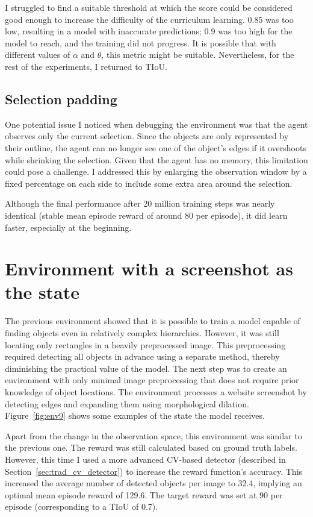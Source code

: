 \documentclass[
  digital,     %
  oneside,     %
  nosansbold,  %
  nocolorbold, %
  lof,         %
  lot,         %
]{fithesis4}
\begin{document}
I struggled to find a suitable threshold at which the score could be considered good enough to increase the difficulty of the curriculum learning. 0.85 was too low, resulting in a model with inaccurate predictions; 0.9 was too high for the model to reach, and the training did not progress. It is possible that with different values of $\alpha$ and $\theta$, this metric might be suitable. Nevertheless, for the rest of the experiments, I returned to TIoU.

\subsection{Selection padding}

One potential issue I noticed when debugging the environment was that the agent observes only the current selection. Since the objects are only represented by their outline, the agent can no longer see one of the object's edges if it overshoots while shrinking the selection. Given that the agent has no memory, this limitation could pose a challenge. I addressed this by enlarging the observation window by a fixed percentage on each side to include some extra area around the selection.

Although the final performance after 20 million training steps was nearly identical (stable mean episode reward of around 80 per episode), it did learn faster, especially at the beginning.

\section{Environment with a screenshot as the state}

The previous environment showed that it is possible to train a model capable of finding objects even in relatively complex hierarchies. However, it was still locating only rectangles in a heavily preprocessed image. This preprocessing required detecting all objects in advance using a separate method, thereby diminishing the practical value of the model. The next step was to create an environment with only minimal image preprocessing that does not require prior knowledge of object locations. The environment processes a website screenshot by detecting edges and expanding them using morphological dilation. Figure~\ref{fig:env9} shows some examples of the state the model receives.

Apart from the change in the observation space, this environment was similar to the previous one. The reward was still calculated based on ground truth labels. However, this time I used a more advanced CV-based detector (described in Section~\ref{sec:trad_cv_detector}) to increase the reward function's accuracy. This increased the average number of detected objects per image to 32.4, implying an optimal mean episode reward of 129.6. The target reward was set at 90 per episode (corresponding to a TIoU of 0.7).
\end{document}
